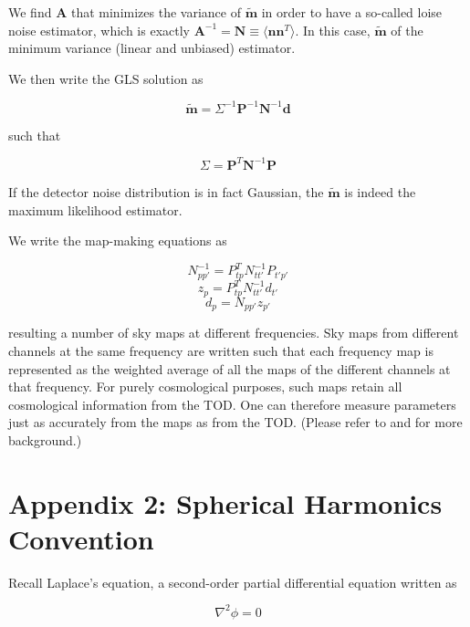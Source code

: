\documentclass[12pt]{article}
\begin{document}
We find $\textbf{A}$ that minimizes the variance of $\widetilde{\textbf{m}}$ in order to have a so-called loise noise estimator, which is exactly $\textbf{A}^{-1}=\textbf{N}\equiv\langle\textbf{nn}^{T}\rangle$. In this case,  $\widetilde{\textbf{m}}$ of the minimum variance (linear and unbiased) estimator. 

We then write the GLS solution as 

\begin{equation}
 \widetilde{\textbf{m}}=\Sigma^{-1}\textbf{P}^{-1}\textbf{N}^{-1}\textbf{d}
\end{equation}

such that 

\begin{equation}
\Sigma=\textbf{P}^{T}\textbf{N}^{-1}\textbf{P}
\end{equation}

If the detector noise distribution is in fact Gaussian, the $\widetilde{\textbf{m}}$ is indeed the maximum likelihood estimator. 

We write the map-making equations as 

\begin{equation}
N^{-1}_{pp'}=P^{T}_{tp}N^{-1}_{tt'}P_{t'p'}
\end{equation}
\begin{equation}
z_p=P^{T}_{tp}N^{-1}_{tt'}d_{t'}
\end{equation}
\begin{equation}
d_p=N_{pp'}z_{p'}
\end{equation}

resulting a number of sky maps at different frequencies. Sky maps from different channels at the same frequency are written such that each frequency map is represented as the weighted average of all the maps of the different channels at that frequency. For purely cosmological purposes, such maps retain all cosmological information from the TOD. One can therefore measure parameters just as accurately from the maps as from the TOD. (Please refer to \cite{ELWright} and \cite{TegmarkMap} for more background.)

\section*{Appendix 2: Spherical Harmonics Convention}

Recall Laplace's equation, a second-order partial differential equation written as

\begin{equation}
\nabla^2\phi=0
\end{equation}
\end{document}
